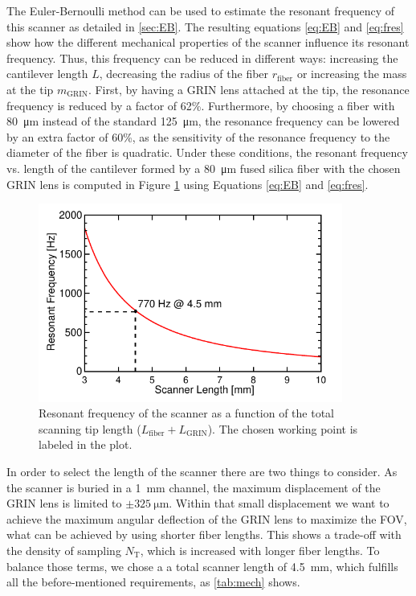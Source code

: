 The Euler-Bernoulli method can be used to estimate the resonant frequency of this scanner as detailed in \autoref{sec:EB}. The resulting equations \ref{eq:EB} and \ref{eq:fres} show how the different mechanical properties of the scanner influence its resonant frequency. Thus, this frequency can be reduced in different ways: increasing the cantilever length $L$, decreasing the radius of the fiber $r_\mathrm{fiber}$ or increasing the mass at the tip $m_{\mathrm{GRIN}}$. First, by having a GRIN lens attached at the tip, the resonance frequency is reduced by a factor of 62\%. Furthermore, by choosing a fiber with \SI{80}{\micro\meter} instead of the standard \SI{125}{\micro\meter}, the resonance frequency can be lowered by an extra factor of 60\%, as the sensitivity of the resonance frequency to the diameter of the fiber is quadratic. Under these conditions, the resonant frequency vs. length of the cantilever formed by a \SI{80}{\micro\meter} fused silica fiber with the chosen GRIN lens is computed in Figure \ref{fig:freq} using Equations \ref{eq:EB} and \ref{eq:fres}.

\begin{figure}[h!]\centering
      \includegraphics[width=10cm]{figures/30_DesignSimulation/Mechanical/fres/fres.pdf}
      \caption{Resonant frequency of the scanner as a function of the total scanning tip length ($L_\mathrm{fiber} + L_\mathrm{GRIN}$). The chosen working point is labeled in the plot.}
      \label{fig:freq}
\end{figure}

In order to select the length of the scanner there are two things to consider. As the scanner is buried in a \SI{1}{\milli\meter} channel, the maximum displacement of the GRIN lens is limited to $\pm\SI{325}{\micro\meter}$. Within that small displacement we want to achieve the maximum angular deflection of the GRIN lens to maximize the FOV, what can be achieved by using shorter fiber lengths. This shows a trade-off with the density of sampling $N_\mathrm{T}$, which is increased with longer fiber lengths. To balance those terms, we chose a a total scanner length of \SI{4.5}{\milli\meter}, which fulfills all the before-mentioned requirements, as \autoref{tab:mech} shows. 

